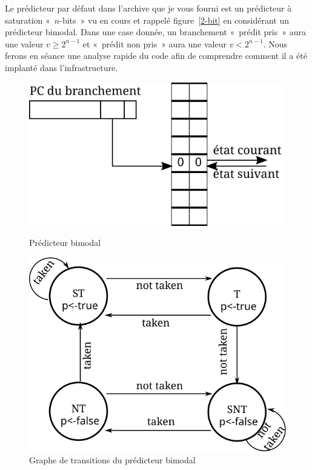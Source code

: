 \documentclass[a4paper]{article}
\begin{document}
Le prédicteur par défaut dans l'archive que je vous fourni est un prédicteur à saturation «~$n$-bits~» vu en cours et rappelé figure~\ref{2-bit} en considérant un prédicteur bimodal.
Dans une case donnée, un branchement «~prédit pris~» aura une valeur $v\geq 2^{n-1}$ et «~prédit non pris~» aura une valeur $v<2^{n-1}$.
Nous ferons en séance une analyse rapide du code afin de comprendre comment il a été implanté dans l'infrastructure.

\begin{figure}[htb]
   \begin{minipage}[t]{.44\linewidth}\vspace{0pt}
      \center\includegraphics[scale=1]{2-bits}
      \caption{Prédicteur bimodal}
      \label{2-bit}
   \end{minipage}%
\hfill
   \begin{minipage}[t]{.54\linewidth}\vspace{0pt}
      \center\includegraphics[scale=.65]{2bg1}
      \caption{\label{2bg1}Graphe de transitions du prédicteur bimodal}
   \end{minipage}
\end{figure}
\end{document}
